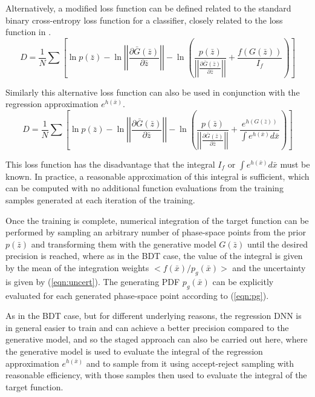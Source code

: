 \documentclass[a4paper,11pt]{article}
\begin{document}
Alternatively, a modified loss function can be defined related to the standard binary cross-entropy loss function for a classifier, closely related to the loss function in \cite{gan}.
  \begin{equation}
  D = \frac{1}{N}\sum\left[\ln p(\bar z) - \ln\left|\left|\frac{\partial \bar G(\bar z)}{\partial\bar z}\right|\right| - \ln\left(\frac{p(\bar z)}{\left|\left|\frac{\partial \bar G(\bar z)}{\partial\bar z}\right|\right|} + \frac{f(G(\bar z))}{I_f}\right) \right]
  \end{equation}

Similarly this alternative loss function can also be used in conjunction with the regression approximation $e^{h(\bar x)}$.
  \begin{equation}
  D = \frac{1}{N}\sum\left[\ln p(\bar z) - \ln\left|\left|\frac{\partial \bar G(\bar z)}{\partial\bar z}\right|\right| - \ln\left(\frac{p(\bar z)}{\left|\left|\frac{\partial \bar G(\bar z)}{\partial\bar z}\right|\right|} + \frac{e^{h(G(\bar z))}}{\int e^{h(\bar x)}d\bar x}\right) \right]
  \end{equation}

This loss function has the disadvantage that the integral $I_f$ or $\int e^{h(\bar x)}d\bar x$ must be known.  In practice, a reasonable approximation of this integral is sufficient, which can be computed with no additional function evaluations from the training samples generated at each iteration of the training.


Once the training is complete, numerical integration of the target function can be performed by sampling an arbitrary number of phase-space points from the prior $p(\bar z)$ and transforming them with the generative model $G(\bar z)$ until the desired precision is reached, where as in the BDT case, the value of the integral is given by the mean of the integration weights $<f(\bar x)/p_g(\bar x)>$ and the uncertainty is given by (\ref{eqn:uncert}).  The generating PDF $p_g(\bar x)$ can be explicitly evaluated for each generated phase-space point according to (\ref{eqn:pg}).

As in the BDT case, but for different underlying reasons, the regression DNN is in general easier to train and can achieve a better precision compared to the generative model, and so the staged approach can also be carried out here, where the generative model is used to evaluate the integral of the regression approximation $e^{h(\bar x)}$ and to sample from it using accept-reject sampling with reasonable efficiency, with those samples then used to evaluate the integral of the target function.
\end{document}
